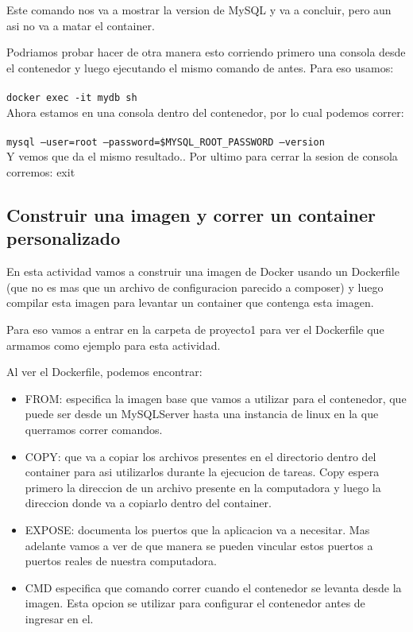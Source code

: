 \documentclass[11pt]{article} %
\begin{document}
Este comando nos va a mostrar la version de MySQL y va a concluir, pero aun asi no va a matar el container. 

Podriamos probar hacer de otra manera esto corriendo primero una consola desde el contenedor y luego ejecutando el mismo comando de antes. Para eso usamos:\\ \\
	\texttt{docker exec -it mydb sh} \\

Ahora estamos en una consola dentro del contenedor, por lo cual podemos correr: \\ \\
	\texttt{mysql --user=root --password=\$MYSQL\_ROOT\_PASSWORD --version} \\

Y vemos que da el mismo resultado.. Por ultimo para cerrar la sesion de consola corremos: exit


\subsection{Construir una imagen y correr un container personalizado}

En esta actividad vamos a construir una imagen de Docker usando un Dockerfile (que no es mas que un archivo de configuracion parecido a composer) y luego compilar esta imagen para levantar un container que contenga esta imagen. 

Para eso vamos a entrar en la carpeta de proyecto1 para ver el Dockerfile que armamos como ejemplo para esta actividad.

Al ver el Dockerfile, podemos encontrar:
\begin{itemize}
	\item
	FROM: especifica la imagen base que vamos a utilizar para el contenedor, que puede ser desde un MySQLServer hasta una instancia de linux en la que querramos correr comandos.

	\item
	COPY: que va a copiar los archivos presentes en el directorio dentro del container para asi utilizarlos durante la ejecucion de tareas.
	Copy espera primero la direccion de un archivo presente en la computadora y luego la direccion donde va a copiarlo dentro del container.
	
	\item	
	EXPOSE: documenta los puertos que la aplicacion va a necesitar. Mas adelante vamos a ver de que manera se pueden vincular estos puertos a puertos reales de nuestra computadora.
	
	\item
	CMD especifica que comando correr cuando el contenedor se levanta desde la imagen. Esta opcion se utilizar para configurar el contenedor antes de ingresar en el.
\end{itemize}
\end{document}
